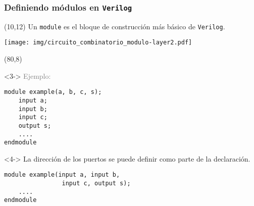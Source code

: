 \documentclass[aspectratio=169]{beamer}
\begin{document}
\begin{frame}[fragile,t]
    \begin{center}
    \end{center}
\end{frame}

\begin{frame}[fragile,t]
    \frametitle{Definiendo módulos en \texttt{Verilog}}
    \begin{textblock}{60}(10,12)
    Un \textcolor{naranjauca}{\texttt{module}} es el bloque de construcción más básico de \texttt{Verilog}.\\
    \begin{center}
    \texttt{[image: img/circuito\_combinatorio\_modulo-layer2.pdf]}
    \end{center}
    \end{textblock}
    \begin{textblock}{65}(80,8)
    \begin{onlyenv}<3->
    \textcolor{gray}{Ejemplo:}
\begin{lstlisting}
module example(a, b, c, s);
    input a;
    input b;
    input c;
    output s;
    ....
endmodule
\end{lstlisting}
    \end{onlyenv}
    \begin{onlyenv}<4->
    La dirección de los puertos se puede definir como parte de la declaración.
\begin{lstlisting}
module example(input a, input b,
                input c, output s);
    ....
endmodule
\end{lstlisting}
    \end{onlyenv}
    \end{textblock}
\end{frame}
\end{document}
